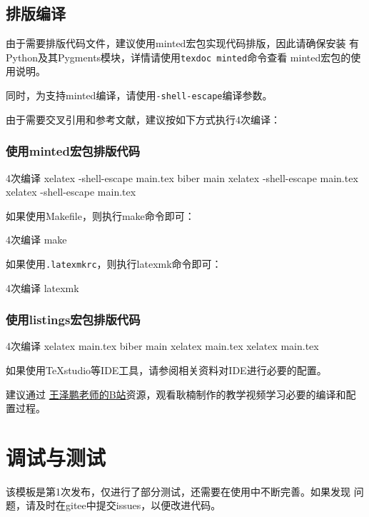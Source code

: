 \documentclass[
  ]{nwafuprojrep}
\begin{document}
\subsection{排版编译}
\begin{importantBox}
  由于需要排版代码文件，建议使用minted宏包实现代码排版，因此请确保安装
  有Python及其Pygments模块，详情请使用\verb|texdoc minted|命令查看
  minted宏包的使用说明。

  同时，为支持minted编译，请使用\verb|-shell-escape|编译参数。  
\end{importantBox}

由于需要交叉引用和参考文献，建议按如下方式执行4次编译：

\subsubsection{使用minted宏包排版代码}
\begin{ubtdark}{4次编译}
  xelatex -shell-escape main.tex
  biber main
  xelatex -shell-escape main.tex
  xelatex -shell-escape main.tex
\end{ubtdark}

如果使用Makefile，则执行make命令即可：

\begin{ubtdark}{4次编译}
  make
\end{ubtdark}

如果使用\verb|.latexmkrc|，则执行latexmk命令即可：

\begin{ubtdark}{4次编译}
  latexmk
\end{ubtdark}

\subsubsection{使用listings宏包排版代码}
\begin{ubtdark}{4次编译}
  xelatex main.tex
  biber main
  xelatex main.tex
  xelatex main.tex
\end{ubtdark}

如果使用TeXstudio等IDE工具，请参阅相关资料对IDE进行必要的配置。

建议通过
\href{https://space.bilibili.com/1374419?from=search&seid=9480597470053264528}{
  王泽鹏老师的B站}资源，观看耿楠制作的教学视频学习必要的编译和配置过程。


\section{调试与测试}
该模板是第1次发布，仅进行了部分测试，还需要在使用中不断完善。如果发现
问题，请及时在gitee中提交issues，以便改进代码。
\end{document}
